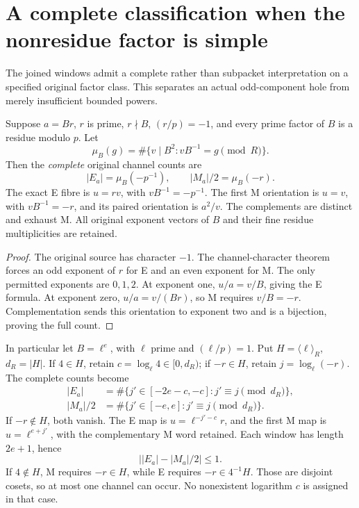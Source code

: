 \section{A complete classification when the nonresidue factor is simple}
The joined windows admit a complete rather than subpacket interpretation on a
specified original factor class. This separates an actual odd-component hole
from merely insufficient bounded powers.

\begin{theorem}\label{thm:simpleNR}
Suppose $a=Br$, $r$ is prime, $r\nmid B$, $(r/p)=-1$, and every prime factor of
$B$ is a residue modulo $p$. Let
\[
 \mu_B(g)=\#\{v\mid B^2:vB^{-1}=g\pmod R\}.
\]
Then the \emph{complete} original channel counts are
\[
 \boxed{|E_a|=\mu_B(-p^{-1}),\qquad |M_a|/2=\mu_B(-r).}  \tag{W7}
\]
The exact E fibre is $u=rv$, with $vB^{-1}=-p^{-1}$. The first M orientation
is $u=v$, with $vB^{-1}=-r$, and its paired orientation is $a^2/v$.
The complements are distinct and exhaust M. All original exponent vectors of
$B$ and their fine residue multiplicities are retained.
\end{theorem}
\begin{proof}
The original source has character $-1$. The channel-character theorem forces
an odd exponent of $r$ for E and an even exponent for M. The only permitted
exponents are $0,1,2$. At exponent one, $u/a=v/B$, giving the E formula.
At exponent zero, $u/a=v/(Br)$, so M requires $v/B=-r$. Complementation sends
this orientation to exponent two and is a bijection, proving the full count.
\end{proof}

In particular let $B=\ell^e$, with $\ell$ prime and $(\ell/p)=1$. Put
$H=\langle\ell\rangle_R$, $d_R=|H|$. If $4\in H$, retain
$c=\log_\ell 4\in[0,d_R)$; if $-r\in H$, retain $j=\log_\ell(-r)$.
The complete counts become
\[
 \boxed{\begin{aligned}
 |E_a|&=\#\{j'\in[-2e-c,-c]:j'\equiv j\pmod{d_R}\},\\
 |M_a|/2&=\#\{j'\in[-e,e]:j'\equiv j\pmod{d_R}\}.
 \end{aligned}}                                           \tag{W8}
\]
If $-r\notin H$, both vanish. The E map is $u=\ell^{-j'-c}r$, and the first
M map is $u=\ell^{e+j'}$, with the complementary M word retained. Each window
has length $2e+1$, hence
\[
 \boxed{\bigl||E_a|-|M_a|/2\bigr|\le1.}                  \tag{W9}
\]
If $4\notin H$, M requires $-r\in H$, while E requires $-r\in4^{-1}H$.
Those are disjoint cosets, so at most one channel can occur. No nonexistent
logarithm $c$ is assigned in that case.


